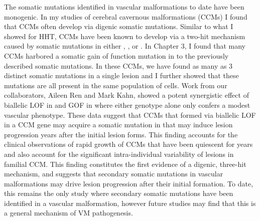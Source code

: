 The somatic mutations identified in vascular malformations to date have been monogenic. In my studies of cerebral cavernous malformations (CCMs) I found that CCMs often develop via digenic somatic mutations. Similar to what I showed for HHT, CCMs have been known to develop via a two-hit mechanism caused by somatic mutations in either , , or . In Chapter 3, I found that many CCMs harbored a somatic gain of function mutation in   to the previously described somatic mutations. In these CCMs, we have found as many as 3 distinct somatic mutations in a single lesion and I further showed that these mutations are all present in the same population of cells. Work from our collaborators, Aileen Ren and Mark Kahn, showed a potent synergistic effect of biallelic LOF in  and GOF in  where either genotype alone only confers a modest vascular phenotype. These data suggest that CCMs that formed via biallelic LOF in a CCM gene may acquire a somatic mutation in  that may induce lesion progression years after the initial lesion forms. This finding accounts for the clinical observations of rapid growth of CCMs that have been quiescent for years and also account for the significant intra-individual variability of lesions in familial CCM. This finding constitutes the first evidence of a digenic, three-hit mechanism, and suggests that secondary somatic mutations in vascular malformations may drive lesion progression after their initial formation. To date, this remains the only study where secondary somatic mutations have been identified in a vascular malformation, however future studies may find that this is a general mechanism of VM pathogenesis. 

